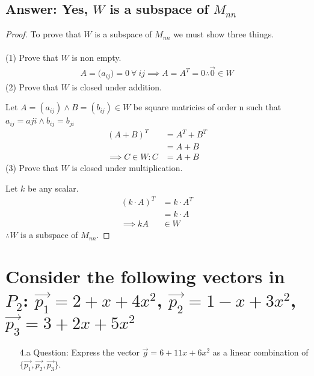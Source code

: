 \documentclass[12pt]{article}
\begin{document}
\subsection{Answer: Yes, $W$ is a subspace of $M_{nn}$}
\begin{proof}
        To prove that $W$ is a subspace of $M_{nn}$ we must show three things.\\\\
        (1) Prove that $W$ is non empty.
        \begin{align*}
                A=({a_{ij})=0}\ \forall\ ij \implies A = A^{T}=0 \therefore \vec{0} \in W
        \end{align*}
        (2) Prove that $W$ is closed under addition.

        Let $A = ({a_{ij}})\land B = ({b_{ij}})\in W$ be square matricies of order n such that $a_{ij}=a{ji}\land b_{ij} = b_{ji}$\
        \begin{align*}
                (A+B)^T             & = A^T+B^T \\
                                    & = A + B   \\
                \implies C\in W : C & = A+B
        \end{align*}
        (3) Prove that $W$ is closed under multiplication.

        Let ${k}$ be any scalar.
        \begin{align*}
                (k\cdot A)^{T} & = k\cdot A^{T} \\
                               & = k\cdot A     \\
                \implies kA    & \in W
        \end{align*}
        $\therefore W$ is a subspace of $M_{nn}$.
\end{proof} \pagebreak
\section{Consider the following vectors in $P_2$: $\vec{p_1} = 2 + x + 4x^2$, $\vec{p_2} = 1 - x + 3x^2$, $\vec{p_3} = 3 + 2x + 5x^2$}
\begin{enumerate}
        \item[4.a]Question: Express the vector $\vec{g} = 6 + 11x + 6x^2$ as a linear combination of $\{\vec{p_1},\vec{p_2},\vec{p_3}\}$.
\end{enumerate}
\end{document}
